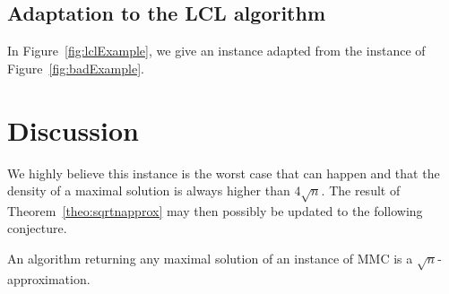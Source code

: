 \subsection{Adaptation to the LCL algorithm}
\renewcommand{\gridsize}{0.35}

In Figure~\ref{fig:lclExample}, we give an instance adapted from the instance of Figure~\ref{fig:badExample}.





\section{Discussion}

We highly believe this instance is the worst case that can happen and that the density of a maximal solution is always higher than $4\sqrt{n}$. The result of Theorem~\ref{theo:sqrtnapprox} may then possibly be updated to the following conjecture. 

\begin{conjecture}
	An algorithm returning any maximal solution of an instance of MMC is a $\sqrt{n}$-approximation.
\end{conjecture}